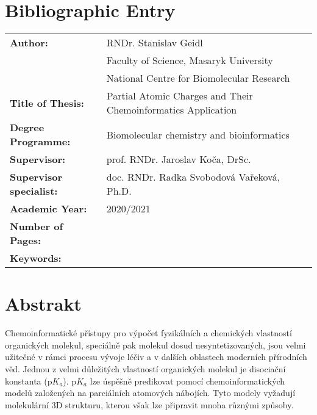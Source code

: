 \documentclass[11pt,b5paper,oneside,final]{book}
\begin{document}
\section*{Bibliographic Entry}
\def\arraystretch{1.5}
\begin{tabular}{ ll } 
  \textbf{Author:}                & RNDr. Stanislav Geidl \\
                                  & Faculty of Science, Masaryk University \\
                                  & National Centre for Biomolecular Research \\
  \textbf{Title of Thesis:}       & Partial Atomic Charges and Their Chemoinformatics Application \\ 
  \textbf{Degree Programme:}      & Biomolecular chemistry and bioinformatics \\
  \textbf{Supervisor:}            & prof. RNDr. Jaroslav Koča, DrSc. \\
  \textbf{Supervisor specialist:} & doc. RNDr. Radka Svobodová Vařeková, Ph.D. \\
  \textbf{Academic Year:}         & 2020/2021 \\
  \textbf{Number of Pages:}       & \\
  \textbf{Keywords:}              & \\
\end{tabular}
\clearpage

\pagestyle{plain}

\section*{Abstrakt}
Chemoinformatické přístupy pro výpočet fyzikálních a chemických vlastností
organických molekul, speciálně pak molekul dosud nesyntetizovaných, jsou velmi
užitečné v rámci procesu vývoje léčiv a v dalších oblastech moderních přírodních
věd. Jednou z velmi důležitých vlastností organických molekul je disociační
konstanta (p$K_a$). p$K_a$ lze úspěšně predikovat pomocí chemoinformatických
modelů založených na parciálních atomových nábojích. Tyto modely vyžadují
molekulární 3D strukturu, kterou však lze připravit mnoha různými způsoby.
\end{document}
